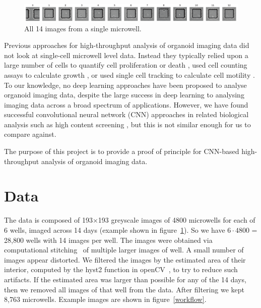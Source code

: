 \documentclass[10pt,twocolumn,letterpaper]{article}
\begin{document}
 \begin{figure}[t!]
\begin{center}
\includegraphics[width=0.9\linewidth]{figures/classification/well_4166_condition_A1_all_days_images_small.pdf}
\end{center}
   \caption{All 14 images from a single microwell.}
\label{well_4166_condition_A1_all_days_images_small}
\end{figure}

Previous approaches for high-throughput analysis of organoid imaging data did not look at single-cell microwell level data.  Instead they typically relied upon a large number of cells to quantify cell proliferation or death \cite{jabs2017screening},  used cell counting assays to calculate growth \cite{sebrell2018live}, or used single cell tracking to calculate cell motility \cite{geum2016epidermal}.  To our knowledge, no deep learning approaches have been proposed to analyse organoid imaging data, despite the large success in deep learning to analysing imaging data across a broad spectrum of applications.  However, we have found successful convolutional neural network (CNN) approaches in related biological analysis such as high content screening \cite{simm2018repurposing}, but this is not similar enough for us to compare against.



The purpose of this project is to provide a proof of principle for CNN-based high-throughput analysis of organoid imaging data.  



\section{Data}








The data is composed of 193$\times$193 greyscale images of 4800 microwells for each of 6 wells, imaged across 14 days (example shown in figure~\ref{well_4166_condition_A1_all_days_images_small}).  So we have $6 \cdot 4800$ = 28,800 wells with 14 images per well.  The images were obtained via computational stitching~\cite{preibisch2009globally} of multiple larger images of well.  A small number of images appear distorted.  We filtered the images by the estimated area of their interior, computed by the hyst2 function in openCV~\cite{opencv_library}, to try to reduce such artifacts.  If the estimated area was larger than possible for any of the 14 days, then we removed all images of that well from the data.  After filtering we kept 8,763 microwells.  Example images are shown in figure~\ref{workflow}.
\end{document}
